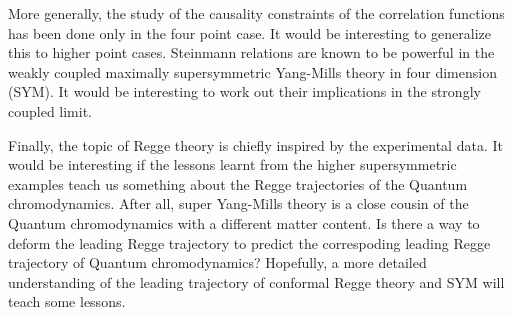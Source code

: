 More generally, the study of the causality constraints of the correlation functions has been done only in the four point case.
It would be interesting to generalize this to higher point cases.
Steinmann relations are known to be powerful in the weakly coupled maximally supersymmetric Yang-Mills theory in four dimension (SYM).
It would be interesting to work out their implications in the strongly coupled limit.

Finally, the topic of Regge theory is chiefly inspired by the experimental data.
It would be interesting if the lessons learnt from the higher supersymmetric examples teach us something about the Regge trajectories of the Quantum chromodynamics.
After all, super Yang-Mills theory is a close cousin of the Quantum chromodynamics with a different matter content.
Is there a way to deform the leading Regge trajectory to predict the correspoding leading Regge trajectory of Quantum chromodynamics?
Hopefully, a more detailed understanding of the leading trajectory of conformal Regge theory and SYM will teach some lessons.



\cleardoublepage
